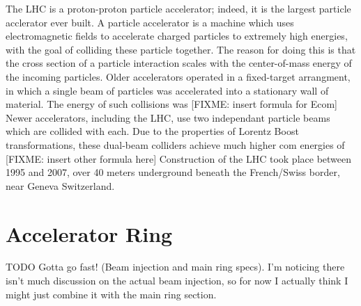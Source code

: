     The LHC is a proton-proton particle accelerator; indeed, it is the largest particle acclerator ever built.
    A particle accelerator is a machine which uses electromagnetic fields to accelerate charged particles to extremely high energies, with the goal of colliding these particle together.
    The reason for doing this is that the cross section of a particle interaction scales with the center-of-mass energy of the incoming particles. %
    Older accelerators operated in a fixed-target arrangment, in which a single beam of particles was accelerated into a stationary wall of material.
    The energy of such collisions was [FIXME: insert formula for Ecom]
    Newer accelerators, including the LHC, use two independant particle beams which are collided with each.
    Due to the properties of Lorentz Boost transformations, these dual-beam colliders achieve much higher com energies of [FIXME: insert other formula here] \cite{modern_and_future_colliders}
    Construction of the LHC took place between 1995 and 2007, over 40 meters underground beneath the French/Swiss border, near Geneva Switzerland. 




\section{Accelerator Ring} TODO
    Gotta go fast! (Beam injection and main ring specs).
    I'm noticing there isn't much discussion on the actual beam injection, so for now I actually think I might just combine it with the main ring section.



